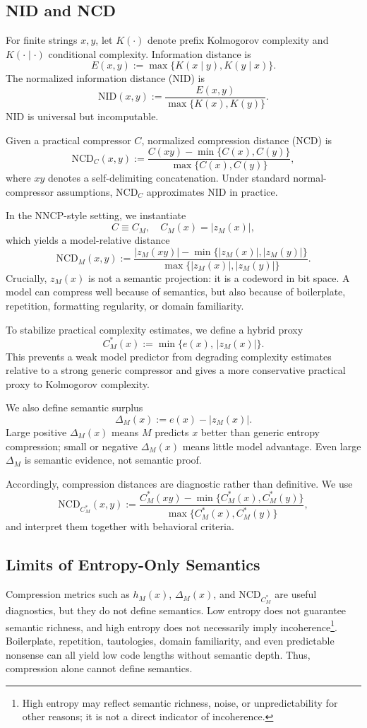 \subsection{NID and NCD}
For finite strings $x,y$, let $K(\cdot)$ denote prefix Kolmogorov complexity and $K(\cdot\mid\cdot)$ conditional complexity. Information distance is
\[
E(x,y) := \max\{K(x\mid y), K(y\mid x)\}.
\]
The normalized information distance (NID) is
\[
\mathrm{NID}(x,y) := \frac{E(x,y)}{\max\{K(x),K(y)\}}.
\]
NID is universal but incomputable.

Given a practical compressor $C$, normalized compression distance (NCD) is
\[
\mathrm{NCD}_C(x,y) :=
\frac{C(xy)-\min\{C(x),C(y)\}}{\max\{C(x),C(y)\}},
\]
where $xy$ denotes a self-delimiting concatenation.
Under standard normal-compressor assumptions, $\mathrm{NCD}_C$ approximates NID in practice.

In the NNCP-style setting, we instantiate
\[
C \equiv C_M, \quad C_M(x)=|z_M(x)|,
\]
which yields a model-relative distance
\[
\mathrm{NCD}_M(x,y) :=
\frac{|z_M(xy)|-\min\{|z_M(x)|,|z_M(y)|\}}{\max\{|z_M(x)|,|z_M(y)|\}}.
\]
Crucially, $z_M(x)$ is not a semantic projection: it is a codeword in bit space. A model can compress well because of semantics, but also because of boilerplate, repetition, formatting regularity, or domain familiarity.

To stabilize practical complexity estimates, we define a hybrid proxy
\[
C_M^*(x) := \min\{e(x),\,|z_M(x)|\}.
\]
This prevents a weak model predictor from degrading complexity estimates relative to a strong generic compressor and gives a more conservative practical proxy to Kolmogorov complexity.

We also define semantic surplus
\[
\Delta_M(x) := e(x)-|z_M(x)|.
\]
Large positive $\Delta_M(x)$ means $M$ predicts $x$ better than generic entropy compression; small or negative $\Delta_M(x)$ means little model advantage. Even large $\Delta_M$ is semantic evidence, not semantic proof.

Accordingly, compression distances are diagnostic rather than definitive. We use
\[
\mathrm{NCD}_{C_M^*}(x,y) :=
\frac{C_M^*(xy)-\min\{C_M^*(x),C_M^*(y)\}}{\max\{C_M^*(x),C_M^*(y)\}},
\]
and interpret them together with behavioral criteria.

\subsection{Limits of Entropy-Only Semantics}

Compression metrics such as $h_M(x)$, $\Delta_M(x)$, and $\mathrm{NCD}_{C_M^*}$ are useful diagnostics, but they do not define semantics. Low entropy does not guarantee semantic richness, and high entropy does not necessarily imply incoherence\footnote{High entropy may reflect semantic richness, noise, or unpredictability for other reasons; it is not a direct indicator of incoherence.}. Boilerplate, repetition, tautologies, domain familiarity, and even predictable nonsense can all yield low code lengths without semantic depth. Thus, compression alone cannot define semantics.


